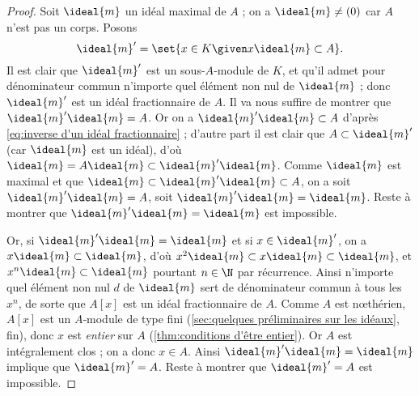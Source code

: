 \documentclass[11pt, useosf,
  title in boldface,
  theorem in new line,
  theorem numbering = section,
  number theorems separately,
]{simplivre}
\begin{document}
    \begin{proof}
        Soit \( \ideal{m} \) un idéal maximal de \( A \) ; on a \( \ideal{m} \neq (0) \) car \( A \) n'est pas un corps. Posons
        \begin{equation}\label{eq:inverse d'un idéal fractionnaire}
            \ideal{m}' = \set{ x \in K \given x\ideal{m} \subset A }.
        \end{equation}
        Il est clair que \( \ideal{m}' \) est un sous-\( A \)‑module de \( K \), et qu'il admet pour dénominateur commun n'importe quel élément non nul de \( \ideal{m} \) ; donc \( \ideal{m}' \) est un idéal fractionnaire de \( A \). Il va nous suffire de montrer que \( \ideal{m}'\ideal{m} = A \). Or on a \( \ideal{m}'\ideal{m} \subset A \) d'après \eqref{eq:inverse d'un idéal fractionnaire} ; d'autre part il est clair que \( A \subset \ideal{m}' \) (car \( \ideal{m} \) est un idéal), d'où \( \ideal{m} = A \ideal{m} \subset \ideal{m}'\ideal{m} \). Comme \( \ideal{m} \) est maximal et que \( \ideal{m} \subset \ideal{m}'\ideal{m} \subset A \), on a soit \( \ideal{m}'\ideal{m} = A \), soit \( \ideal{m}'\ideal{m} = \ideal{m} \). Reste à montrer que \( \ideal{m}'\ideal{m} = \ideal{m} \) est impossible.

        Or, si \( \ideal{m}'\ideal{m} = \ideal{m} \) et si \( x \in \ideal{m}' \), on a \( x \ideal{m} \subset \ideal{m} \), d'où \( x^2 \ideal{m} \subset x \ideal{m} \subset \ideal{m} \), et \( x^n \ideal{m} \subset \ideal{m} \) pourtant \( n \in \N \) par récurrence. Ainsi n'importe quel élément non nul \( d \) de \( \ideal{m} \) sert de dénominateur commun à tous les \( x^n \), de sorte que \( A[x] \) est un idéal fractionnaire de \( A \). Comme \( A \) est nœthérien, \( A[x] \) est un \( A \)‑module de type fini (\cref{sec:quelques préliminaires sur les idéaux}, fin), donc \( x \) est \emph{entier} sur \( A \) (\cref{thm:conditions d'être entier}). Or \( A \) est intégralement clos ; on a donc \( x \in A \). Ainsi \( \ideal{m}'\ideal{m} = \ideal{m} \) implique que \( \ideal{m}' = A \). Reste à montrer que \( \ideal{m}' = A \) est impossible.


\end{proof}
\end{document}
